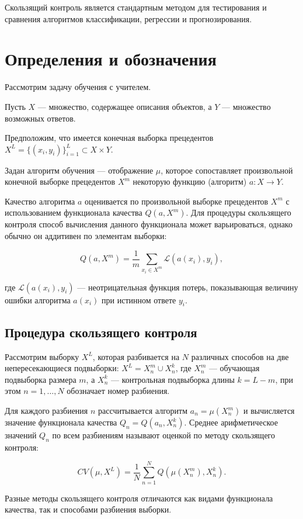 Скользящий контроль является стандартным методом для тестирования и сравнения алгоритмов классификации, регрессии и прогнозирования.

\section{Определения и обозначения}

Рассмотрим задачу обучения с учителем.

Пусть $X$ — множество, содержащее описания объектов, а $Y$ — множество возможных ответов.

Предположим, что имеется конечная выборка прецедентов $X^L = \{(x_i, y_i)\}_{i=1}^L \subset X \times Y$.

Задан алгоритм обучения — отображение $\mu$, которое сопоставляет произвольной конечной выборке прецедентов $X^m$ некоторую функцию (алгоритм) $a : X \to Y$.

Качество алгоритма $a$ оценивается по произвольной выборке прецедентов $X^m$ с использованием функционала качества $Q(a, X^m)$. Для процедуры скользящего контроля способ вычисления данного функционала может варьироваться, однако обычно он аддитивен по элементам выборки:

\[
Q(a, X^m) = \frac{1}{m} \sum_{x_i \in X^m} \mathcal{L}(a(x_i), y_i),
\]

где $\mathcal{L}(a(x_i), y_i)$ — неотрицательная функция потерь, показывающая величину ошибки алгоритма $a(x_i)$ при истинном ответе $y_i$.

\subsection{Процедура скользящего контроля}

Рассмотрим выборку $X^L$, которая разбивается на $N$ различных способов на две непересекающиеся подвыборки: $X^L = X^m_n \cup X^k_n$, где $X^m_n$ — обучающая подвыборка размера $m$, а $X^k_n$ — контрольная подвыборка длины $k = L - m$, при этом $n = 1, \ldots, N$ обозначает номер разбиения.

Для каждого разбиения $n$ рассчитывается алгоритм $a_n = \mu(X^m_n)$ и вычисляется значение функционала качества $Q_n = Q(a_n, X^k_n)$. Среднее арифметическое значений $Q_n$ по всем разбиениям называют оценкой по методу скользящего контроля:

\[
CV(\mu, X^L) = \frac{1}{N} \sum_{n=1}^N Q(\mu(X^m_n), X^k_n).
\]

Разные методы скользящего контроля отличаются как видами функционала качества, так и способами разбиения выборки.


